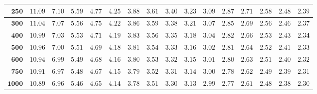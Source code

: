 \begin{longtable}{|r|r|r|r|r|r|r|r|r|r|r|r|r|r|r|r|}
    \(\mathbf{250}\) & \(11.09\) & \(7.10\) & \(5.59\) & \(4.77\) & \(4.25\) & \(3.88\) & \(3.61\) & \(3.40\) & \(3.23\) & \(3.09\) & \(2.87\) & \(2.71\) & \(2.58\) & \(2.48\) & \(2.39\) \\ \hline 
    \(\mathbf{300}\) & \(11.04\) & \(7.07\) & \(5.56\) & \(4.75\) & \(4.22\) & \(3.86\) & \(3.59\) & \(3.38\) & \(3.21\) & \(3.07\) & \(2.85\) & \(2.69\) & \(2.56\) & \(2.46\) & \(2.37\) \\ \hline 
    \(\mathbf{400}\) & \(10.99\) & \(7.03\) & \(5.53\) & \(4.71\) & \(4.19\) & \(3.83\) & \(3.56\) & \(3.35\) & \(3.18\) & \(3.04\) & \(2.82\) & \(2.66\) & \(2.53\) & \(2.43\) & \(2.34\) \\ \hline 
    \(\mathbf{500}\) & \(10.96\) & \(7.00\) & \(5.51\) & \(4.69\) & \(4.18\) & \(3.81\) & \(3.54\) & \(3.33\) & \(3.16\) & \(3.02\) & \(2.81\) & \(2.64\) & \(2.52\) & \(2.41\) & \(2.33\) \\ \hline 
    \(\mathbf{600}\) & \(10.94\) & \(6.99\) & \(5.49\) & \(4.68\) & \(4.16\) & \(3.80\) & \(3.53\) & \(3.32\) & \(3.15\) & \(3.01\) & \(2.80\) & \(2.63\) & \(2.51\) & \(2.40\) & \(2.32\) \\ \hline 
    \(\mathbf{750}\) & \(10.91\) & \(6.97\) & \(5.48\) & \(4.67\) & \(4.15\) & \(3.79\) & \(3.52\) & \(3.31\) & \(3.14\) & \(3.00\) & \(2.78\) & \(2.62\) & \(2.49\) & \(2.39\) & \(2.31\) \\ \hline 
    \(\mathbf{1000}\) & \(10.89\) & \(6.96\) & \(5.46\) & \(4.65\) & \(4.14\) & \(3.78\) & \(3.51\) & \(3.30\) & \(3.13\) & \(2.99\) & \(2.77\) & \(2.61\) & \(2.48\) & \(2.38\) & \(2.30\) \\ \hline
\end{longtable}
\changefontsizes{11pt}

\setlength{\LTleft}{0in} %
\setlength{\LTright}{0in} %


\newpage

